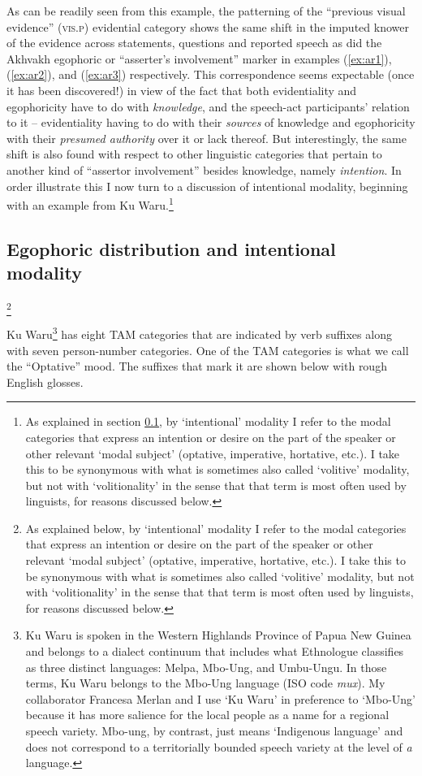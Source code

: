 \documentclass[output=paper]{langsci/langscibook}
\begin{document}
As can be readily seen from this example, the patterning of the “previous visual evidence” (\textsc{vis}.\textsc{p}) evidential category shows the same shift in the imputed knower of the evidence across statements, questions and reported speech as did the Akhvakh egophoric or “asserter’s involvement” marker in examples (\ref{ex:ar1}), (\ref{ex:ar2}), and (\ref{ex:ar3}) respectively. This correspondence seems expectable (once it has been discovered!) in view of the fact that both evidentiality and egophoricity have to do with \textit{knowledge}, and the speech-act participants’ relation to it – evidentiality having to do with their \textit{sources} of knowledge and egophoricity with their \textit{presumed authority} over it or lack thereof. But interestingly, the same shift is also found with respect to other linguistic categories that pertain to another kind of “assertor involvement” besides knowledge, namely \textit{intention}. In order illustrate this I now turn to a discussion of intentional modality, beginning with an example from Ku Waru.\footnote{As explained in section \ref{s:ar2-2}, by ‘intentional’ modality I refer to the modal categories that express an intention or desire on the part of the speaker or other relevant ‘modal subject’ (optative, imperative, hortative, etc.). I take this to be synonymous with what is sometimes also called ‘volitive’ modality, but not with ‘volitionality’ in the sense that that term is most often used by linguists, for reasons discussed below.}


\subsection{Egophoric distribution and intentional modality}\label{s:ar2-2}

\footnote{As explained below, by ‘intentional’ modality I refer to the modal categories that express an intention or desire on the part of the speaker or other relevant ‘modal subject’ (optative, imperative, hortative, etc.). I take this to be synonymous with what is sometimes also called ‘volitive’ modality, but not with ‘volitionality’ in the sense that that term is most often used by linguists, for reasons discussed below.}

Ku Waru\footnote{Ku Waru is spoken in the Western Highlands Province of Papua New Guinea and belongs to a dialect continuum that includes what Ethnologue classifies as three distinct languages: Melpa, Mbo-Ung, and Umbu-Ungu. In those terms, Ku Waru belongs to the Mbo-Ung language (ISO code \textit{mux}). My collaborator Francesa Merlan and I use ‘Ku Waru’ in preference to ‘Mbo-Ung’ because it has more salience for the local people as a name for a regional speech variety. Mbo-ung, by contrast, just means ‘Indigenous language’ and does not correspond to a territorially bounded speech variety at the level of \textit{a} language.} has eight TAM categories that are indicated by verb suffixes along with seven person-number categories. One of the TAM categories is what we call the “Optative” mood. The suffixes that mark it are shown below with rough English glosses.
\end{document}
